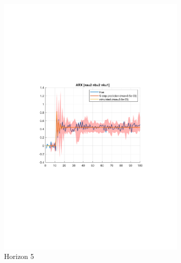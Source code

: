 \documentclass[]{article}
\begin{document}
\begin{figure}[ht]
\begin{subfigure}{.30\textwidth}
	\includegraphics[trim= 10cm 8cm 10cm 8cm, scale=0.3]{figures/1d-horizon_5.pdf}
	\caption{Horizon 5}
	\label{fig:1d-horizon5}
\end{subfigure}
\begin{subfigure}{.30\textwidth}
	\centering

\end{subfigure}
\end{figure}
\end{document}
